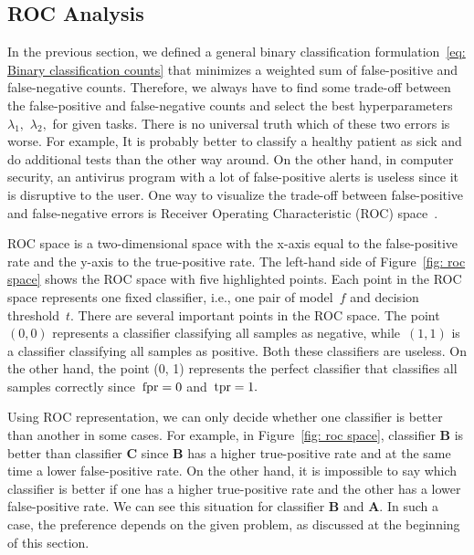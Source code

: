 \subsection{ROC Analysis}\label{subsec: ROC}

In the previous section, we defined a general binary classification formulation~\eqref{eq: Binary classification counts} that minimizes a weighted sum of false-positive and false-negative counts. Therefore, we always have to find some trade-off between the false-positive and false-negative counts and select the best hyperparameters~$\lambda_1,$ $\lambda_2,$ for given tasks. There is no universal truth which of these two errors is worse. For example, It is probably better to classify a healthy patient as sick and do additional tests than the other way around. On the other hand, in computer security, an antivirus program with a lot of false-positive alerts is useless since it is disruptive to the user. One way to visualize the trade-off between false-positive and false-negative errors is Receiver Operating Characteristic (ROC) space~\cite{egan1975signal, fawcett2006introduction}.

ROC space is a two-dimensional space with the x-axis equal to the false-positive rate and the y-axis to the true-positive rate. The left-hand side of Figure~\ref{fig: roc space} shows the ROC space with five highlighted points. Each point in the ROC space represents one fixed classifier, i.e., one pair of model~$f$ and decision threshold~$t.$ There are several important points in the ROC space. The point~$(0, 0)$ represents a classifier classifying all samples as negative, while~$(1, 1)$ is a classifier classifying all samples as positive. Both these classifiers are useless. On the other hand, the point (0, 1) represents the perfect classifier that classifies all samples correctly since~$\operatorname{fpr} = 0$ and~$\operatorname{tpr} = 1.$

Using ROC representation, we can only decide whether one classifier is better than another in some cases. For example, in Figure~\ref{fig: roc space}, classifier \textbf{B} is better than classifier \textbf{C} since \textbf{B} has a higher true-positive rate and at the same time a lower false-positive rate. On the other hand, it is impossible to say which classifier is better if one has a higher true-positive rate and the other has a lower false-positive rate. We can see this situation for classifier \textbf{B} and \textbf{A}. In such a case, the preference depends on the given problem, as discussed at the beginning of this section.

